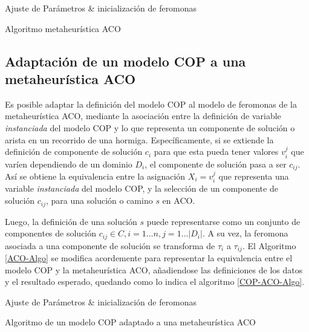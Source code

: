\begin{algorithm}[H]
\SetAlgoLined
 Ajuste de Par\'ametros \& inicializaci\'on de feromonas\;
 \caption{Algoritmo metaheur\'istica ACO}\label{ACO-Algo}
\end{algorithm}


\subsection{Adaptaci\'on de un modelo COP a una metaheur\'istica ACO}

Es posible adaptar la definici\'on del modelo COP al modelo de feromonas de la metaheur\'istica ACO, mediante la asociaci\'on entre la definici\'on de variable {\it instanciada} del modelo COP y lo que representa un componente de soluci\'on o arista en un recorrido de una hormiga. 
Espec\'ificamente, si se extiende la definici\'on de componente de soluci\'on $c_{i}$ para que esta pueda tener valores $v_{i}^{j}$ que var\'ien dependiendo de un dominio $D_i$, el componente de soluci\'on pasa a ser $c_{ij}$. As\'i se obtiene la equivalencia entre la asignaci\'on $X_i = v_{i}^{j}$ que representa una variable {\it instanciada} del modelo COP, y la selecci\'on de un componente de soluci\'on $c_{ij}$,  para una soluci\'on o camino $s$ en ACO\cite{socha2008ant}.


Luego, la definici\'on de una soluci\'on $s$ puede representarse como un conjunto de componentes de soluci\'on $c_{ij} \in C, i = 1 \dotsc n, j = 1 \dotsc |D_i|$. A su vez, la feromona asociada a una componente de soluci\'on se transforma de $\tau_i$ a $\tau_{ij}$. El Algoritmo  \ref{ACO-Algo} se modifica acordemente para representar la equivalencia entre el modelo COP y la metaheur\'istica ACO, a\~nadiendose las definiciones de los datos y el resultado esperado, quedando como lo indica el algoritmo \ref{COP-ACO-Algo}. 


\begin{algorithm}[H]
\SetAlgoLined
{}
 Ajuste de Par\'ametros \& inicializaci\'on de feromonas \;
 \caption{Algoritmo de un modelo COP adaptado a una metaheur\'istica ACO}\label{COP-ACO-Algo}
\end{algorithm}

